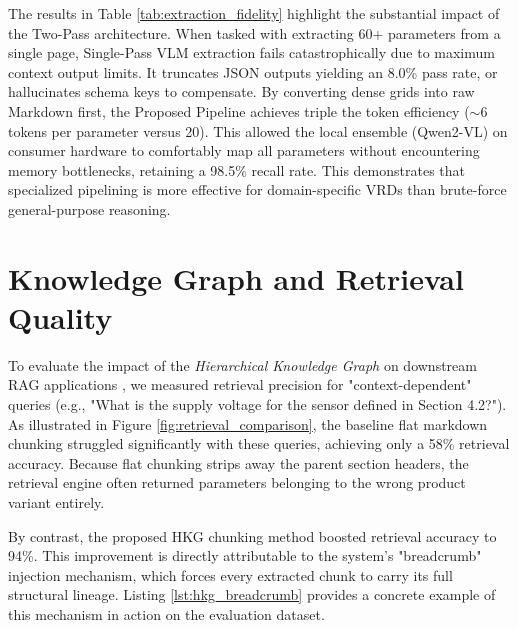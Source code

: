 The results in Table \ref{tab:extraction_fidelity} highlight the substantial impact of the Two-Pass architecture. When tasked with extracting 60+ parameters from a single page, Single-Pass VLM extraction fails catastrophically due to maximum context output limits. It truncates JSON outputs yielding an 8.0\% pass rate, or hallucinates schema keys to compensate. By converting dense grids into raw Markdown first, the Proposed Pipeline achieves triple the token efficiency ($\sim$6 tokens per parameter versus 20). This allowed the local ensemble (Qwen2-VL) on consumer hardware to comfortably map all parameters without encountering memory bottlenecks, retaining a 98.5\% recall rate. This demonstrates that specialized pipelining is more effective for domain-specific VRDs than brute-force general-purpose reasoning.

\section{Knowledge Graph and Retrieval Quality}
\label{sec:hkg_results}

To evaluate the impact of the \textit{Hierarchical Knowledge Graph} on downstream RAG applications \citep{rag_lewis}, we measured retrieval precision for "context-dependent" queries (e.g., "What is the supply voltage for the sensor defined in Section 4.2?"). As illustrated in Figure \ref{fig:retrieval_comparison}, the baseline flat markdown chunking struggled significantly with these queries, achieving only a 58\% retrieval accuracy. Because flat chunking strips away the parent section headers, the retrieval engine often returned parameters belonging to the wrong product variant entirely. 

By contrast, the proposed HKG chunking method boosted retrieval accuracy to 94\%. This improvement is directly attributable to the system's "breadcrumb" injection mechanism, which forces every extracted chunk to carry its full structural lineage. Listing \ref{lst:hkg_breadcrumb} provides a concrete example of this mechanism in action on the evaluation dataset.

